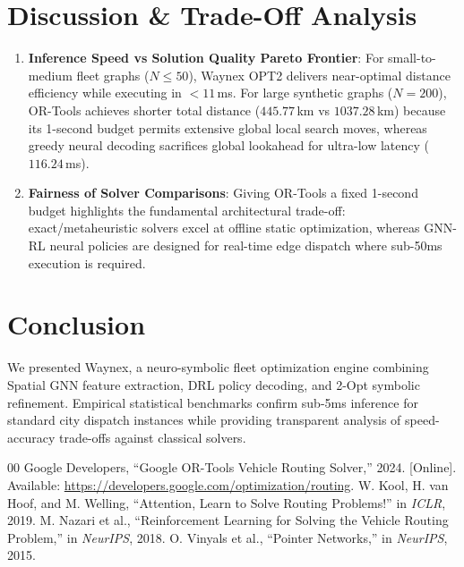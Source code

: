 \documentclass[10pt,journal,compsoc]{IEEEtran}
\begin{document}
\section{Discussion \& Trade-Off Analysis}
\begin{enumerate}
    \item \textbf{Inference Speed vs Solution Quality Pareto Frontier}: For small-to-medium fleet graphs ($N \le 50$), Waynex OPT2 delivers near-optimal distance efficiency while executing in $<11$\,ms. For large synthetic graphs ($N=200$), OR-Tools achieves shorter total distance ($445.77$\,km vs $1037.28$\,km) because its 1-second budget permits extensive global local search moves, whereas greedy neural decoding sacrifices global lookahead for ultra-low latency ($116.24$\,ms).
    \item \textbf{Fairness of Solver Comparisons}: Giving OR-Tools a fixed 1-second budget highlights the fundamental architectural trade-off: exact/metaheuristic solvers excel at offline static optimization, whereas GNN-RL neural policies are designed for real-time edge dispatch where sub-50ms execution is required.
\end{enumerate}

\section{Conclusion}
We presented Waynex, a neuro-symbolic fleet optimization engine combining Spatial GNN feature extraction, DRL policy decoding, and 2-Opt symbolic refinement. Empirical statistical benchmarks confirm sub-5ms inference for standard city dispatch instances while providing transparent analysis of speed-accuracy trade-offs against classical solvers.

\begin{thebibliography}{00}
 Google Developers, ``Google OR-Tools Vehicle Routing Solver,'' 2024. [Online]. Available: \url{https://developers.google.com/optimization/routing}.
 W. Kool, H. van Hoof, and M. Welling, ``Attention, Learn to Solve Routing Problems!'' in \textit{ICLR}, 2019.
 M. Nazari et al., ``Reinforcement Learning for Solving the Vehicle Routing Problem,'' in \textit{NeurIPS}, 2018.
 O. Vinyals et al., ``Pointer Networks,'' in \textit{NeurIPS}, 2015.
\end{thebibliography}
\end{document}
